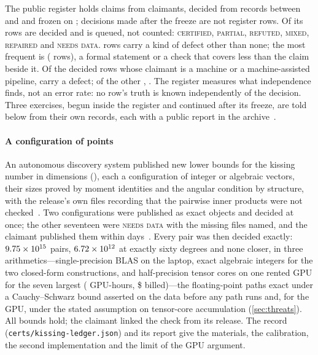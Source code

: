 \documentclass[preprint,11pt,a4paper]{elsarticle}
\theoremstyle{definition}
\newcommand{\verdict}[1]{\textup{\textsc{#1}}}
\newcommand{\CERT}{\verdict{certified}}
\newcommand{\REFT}{\verdict{refuted}}
\begin{document}
The public register holds \RegRows{} claims from \RegClaimants{} claimants, decided from \RegSources{} records between \RegFirstDate{} and \RegLastDate{} and frozen on \RegDate; decisions made after the freeze are not register rows. Of its rows \RegDecided{} are decided and \VQueued{} is queued, not counted: \VCertified{} \CERT, \VPartial{} \verdict{partial}, \VRefuted{} \REFT, \VMixed{} \verdict{mixed}, \VRepaired{} \verdict{repaired} and \VNeedsData{} \verdict{needs data}. \RegDefects{} rows carry a kind of defect other than none; the most frequent is \emph{\KTopDefect} (\KTopDefectRows{} rows), a formal statement or a check that covers less than the claim beside it. Of the \AiRows{} decided rows whose claimant is a machine or a machine-assisted pipeline, \AiRowsDefects{} carry a defect; of the other \OtherRows, \OtherRowsDefects. The register measures what independence finds, not an error rate: no row's truth is known independently of the decision. Three exercises, begun inside the register and continued after its freeze, are told below from their own records, each with a public report in the archive~\citep{CMArchive}.

\paragraph{A configuration of points}
An autonomous discovery system published new lower bounds for the kissing number in \MtKwRows{} dimensions (\MtKwDims), each a configuration of integer or algebraic vectors, their sizes proved by moment identities and the angular condition by structure, with the release's own files recording that the pairwise inner products were not checked~\citep{Yang26}. Two configurations were published as exact objects and decided at once; the other seventeen were \verdict{needs data} with the missing files named, and the claimant published them within days~\citep{QiushiRelease}. Every pair was then decided exactly: $9.75 \times 10^{15}$ pairs, $6.72 \times 10^{12}$ at exactly sixty degrees and none closer, in three arithmetics---single-precision BLAS on the laptop, exact algebraic integers for the two closed-form constructions, and half-precision tensor cores on one rented GPU for the seven largest (\MtKwGpuHours{} GPU-hours, \$\MtKwGpuCost{} billed)---the floating-point paths exact under a Cauchy--Schwarz bound asserted on the data before any path runs and, for the GPU, under the stated assumption on tensor-core accumulation (\cref{sec:threats}). All \MtKwRows{} bounds hold; the claimant linked the check from its release. The record (\texttt{certs/kissing-ledger.json}) and its report give the materials, the calibration, the second implementation and the limit of the GPU argument.
\end{document}
